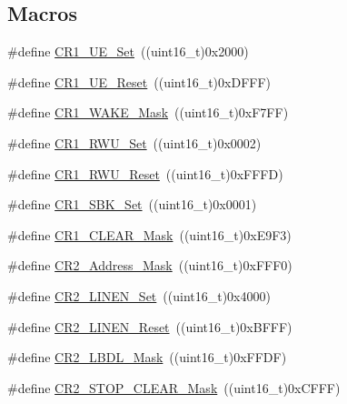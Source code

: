\subsection*{Macros}
\begin{DoxyCompactItemize}
\item 
\#define \hyperlink{group___u_s_a_r_t___private___defines_ga95f5821be56b1a5dbfdd38fdb37ed54c}{C\+R1\+\_\+\+U\+E\+\_\+\+Set}~((uint16\+\_\+t)0x2000)
\item 
\#define \hyperlink{group___u_s_a_r_t___private___defines_ga9c75a44192cb3dbbbf509cddfc47481c}{C\+R1\+\_\+\+U\+E\+\_\+\+Reset}~((uint16\+\_\+t)0x\+D\+F\+F\+F)
\item 
\#define \hyperlink{group___u_s_a_r_t___private___defines_gae4045dea092c3cbfe07d14fef39195ce}{C\+R1\+\_\+\+W\+A\+K\+E\+\_\+\+Mask}~((uint16\+\_\+t)0x\+F7\+F\+F)
\item 
\#define \hyperlink{group___u_s_a_r_t___private___defines_ga5cb566b7c5e126e5ef11dd25bba50ffa}{C\+R1\+\_\+\+R\+W\+U\+\_\+\+Set}~((uint16\+\_\+t)0x0002)
\item 
\#define \hyperlink{group___u_s_a_r_t___private___defines_ga064a46d19ffffddd410e969798d335ee}{C\+R1\+\_\+\+R\+W\+U\+\_\+\+Reset}~((uint16\+\_\+t)0x\+F\+F\+F\+D)
\item 
\#define \hyperlink{group___u_s_a_r_t___private___defines_ga2813b7fa1263aecfeefa48f8a55938b9}{C\+R1\+\_\+\+S\+B\+K\+\_\+\+Set}~((uint16\+\_\+t)0x0001)
\item 
\#define \hyperlink{group___u_s_a_r_t___private___defines_ga67f7dd35ea3d1296677e5fc50b88fa90}{C\+R1\+\_\+\+C\+L\+E\+A\+R\+\_\+\+Mask}~((uint16\+\_\+t)0x\+E9\+F3)
\item 
\#define \hyperlink{group___u_s_a_r_t___private___defines_ga080c343a5a95d4419789b94405c27764}{C\+R2\+\_\+\+Address\+\_\+\+Mask}~((uint16\+\_\+t)0x\+F\+F\+F0)
\item 
\#define \hyperlink{group___u_s_a_r_t___private___defines_gabc3f2b022d70a11fd0605e58cb23023f}{C\+R2\+\_\+\+L\+I\+N\+E\+N\+\_\+\+Set}~((uint16\+\_\+t)0x4000)
\item 
\#define \hyperlink{group___u_s_a_r_t___private___defines_ga7b8fbe7be4c85c16ea1c1e3c9fa95b05}{C\+R2\+\_\+\+L\+I\+N\+E\+N\+\_\+\+Reset}~((uint16\+\_\+t)0x\+B\+F\+F\+F)
\item 
\#define \hyperlink{group___u_s_a_r_t___private___defines_ga9b365a89de44809a52895090e9050646}{C\+R2\+\_\+\+L\+B\+D\+L\+\_\+\+Mask}~((uint16\+\_\+t)0x\+F\+F\+D\+F)
\item 
\#define \hyperlink{group___u_s_a_r_t___private___defines_ga8a2294276016f30cb361a7f54ad07cd4}{C\+R2\+\_\+\+S\+T\+O\+P\+\_\+\+C\+L\+E\+A\+R\+\_\+\+Mask}~((uint16\+\_\+t)0x\+C\+F\+F\+F)

\end{DoxyCompactItemize}
